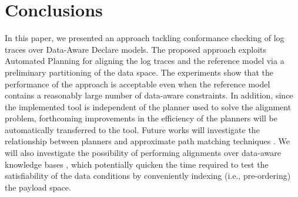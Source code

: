 \section{Conclusions}\label{sec:end}
In this paper, we presented an approach tackling conformance checking of log traces over Data-Aware Declare models. The proposed approach exploits Automated Planning for aligning the log traces and the reference model via a preliminary partitioning of the data space. The experiments show that the performance of the approach is acceptable even when the reference model contains a reasonably large number of data-aware constraints. In addition, since the implemented tool is independent of the planner used to solve the alignment problem, forthcoming improvements in the efficiency of the planners will be automatically transferred to the tool.
%
Future works will investigate the relationship between planners and approximate path matching techniques \cite{Myers1989}. We will also investigate the possibility of performing alignments over data-aware knowledge bases \cite{10.1007/978-3-319-39696-5_18}, which potentially quicken the time required to test the satisfiability of the data conditions by conveniently indexing (i.e., pre-ordering) the payload space. 
